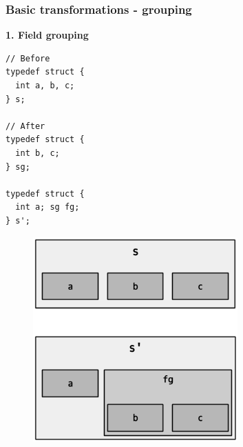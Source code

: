 \begin{frame}[fragile]
\frametitle{Basic transformations - grouping}

\begin{center}
\begin{minipage}{0.3\linewidth}
\textbf{\small 1. Field grouping}
\begin{lstlisting}[style=Cstyle, basicstyle=\scriptsize]
// Before
typedef struct {
  int a, b, c;
} s;

// After
typedef struct {
  int b, c;
} sg;

typedef struct {
  int a; sg fg;
} s';
\end{lstlisting}
\end{minipage}%
\begin{minipage}{0.5\linewidth}
\begin{figure}
	\centering
	\includegraphics[width=0.7\textwidth]{images/grouping}
\end{figure}
\end{minipage}
\end{center}

\end{frame}


